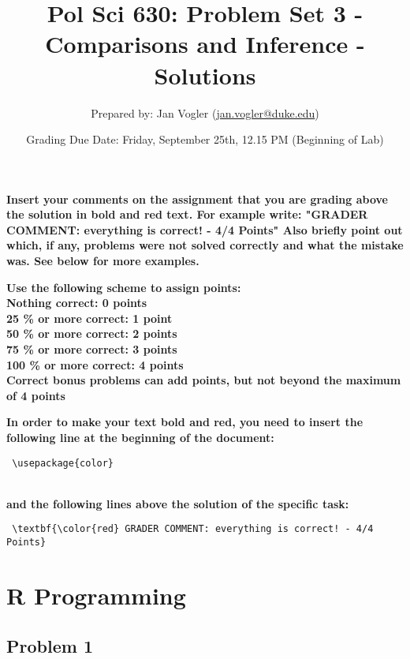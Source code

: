 \documentclass[12pt,letter]{article}\usepackage[]{graphicx}\usepackage[]{color}
\begin{document}
\title{Pol Sci 630: Problem Set 3 - Comparisons and Inference - Solutions}

\author{Prepared by: Jan Vogler (\href{mailto:jan.vogler@duke.edu}{jan.vogler@duke.edu})}

\date{Grading Due Date: Friday, September 25th, 12.15 PM (Beginning of Lab)}
 
\maketitle

\textbf{\color{red} Insert your comments on the assignment that you are grading above the solution in bold and red text. For example write: "GRADER COMMENT: everything is correct! - 4/4 Points" Also briefly point out which, if any, problems were not solved correctly and what the mistake was. See below for more examples.}

\bigskip

\textbf{Use the following scheme to assign points: \\
Nothing correct: 0 points \\ 
25 \% or more correct: 1 point \\
50 \% or more correct: 2 points \\
75 \% or more correct: 3 points \\
100 \% or more correct: 4 points \\
Correct bonus problems can add points, but not beyond the maximum of 4 points}

\bigskip

\textbf{In order to make your text bold and red, you need to insert the following line at the beginning of the document:}

\begin{verbatim} \usepackage{color} \end{verbatim}

\\ \textbf{and the following lines above the solution of the specific task:}

\begin{verbatim} \textbf{\color{red} GRADER COMMENT: everything is correct! - 4/4 Points} \end{verbatim}


\section*{R Programming}

\subsection*{Problem 1}
\end{document}
